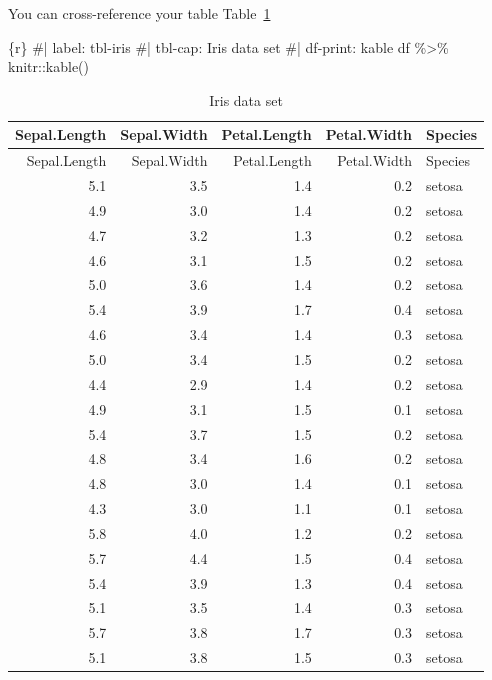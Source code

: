 \documentclass[
  letterpaper,
  DIV=11,
  numbers=noendperiod,
  oneside]{scrreprt}
\newenvironment{Shaded}{\begin{snugshade}}{\end{snugshade}}
\newcommand{\CommentTok}[1]{\textcolor[rgb]{0.37,0.37,0.37}{#1}}
\newcommand{\FunctionTok}[1]{\textcolor[rgb]{0.28,0.35,0.67}{#1}}
\newcommand{\InformationTok}[1]{\textcolor[rgb]{0.37,0.37,0.37}{#1}}
\newcommand{\NormalTok}[1]{\textcolor[rgb]{0.00,0.23,0.31}{#1}}
\newcommand{\SpecialCharTok}[1]{\textcolor[rgb]{0.37,0.37,0.37}{#1}}
\begin{document}
You can cross-reference your table Table~\ref{tbl-iris}

\begin{Shaded}
\begin{Highlighting}[]
\InformationTok{\textasciigrave{}\textasciigrave{}\textasciigrave{}\{r\}}
\CommentTok{\#| label: tbl{-}iris}
\CommentTok{\#| tbl{-}cap: Iris data set}
\CommentTok{\#| df{-}print: kable}
\NormalTok{df }\SpecialCharTok{\%\textgreater{}\%} 
\NormalTok{  knitr}\SpecialCharTok{::}\FunctionTok{kable}\NormalTok{()}
\InformationTok{\textasciigrave{}\textasciigrave{}\textasciigrave{}}
\end{Highlighting}
\end{Shaded}

\hypertarget{tbl-iris}{}
\begin{longtable}[]{@{}rrrrl@{}}
\caption{\label{tbl-iris}Iris data set}\tabularnewline
\toprule()
Sepal.Length & Sepal.Width & Petal.Length & Petal.Width & Species \\
\midrule()
\endfirsthead
\toprule()
Sepal.Length & Sepal.Width & Petal.Length & Petal.Width & Species \\
\midrule()
\endhead
5.1 & 3.5 & 1.4 & 0.2 & setosa \\
4.9 & 3.0 & 1.4 & 0.2 & setosa \\
4.7 & 3.2 & 1.3 & 0.2 & setosa \\
4.6 & 3.1 & 1.5 & 0.2 & setosa \\
5.0 & 3.6 & 1.4 & 0.2 & setosa \\
5.4 & 3.9 & 1.7 & 0.4 & setosa \\
4.6 & 3.4 & 1.4 & 0.3 & setosa \\
5.0 & 3.4 & 1.5 & 0.2 & setosa \\
4.4 & 2.9 & 1.4 & 0.2 & setosa \\
4.9 & 3.1 & 1.5 & 0.1 & setosa \\
5.4 & 3.7 & 1.5 & 0.2 & setosa \\
4.8 & 3.4 & 1.6 & 0.2 & setosa \\
4.8 & 3.0 & 1.4 & 0.1 & setosa \\
4.3 & 3.0 & 1.1 & 0.1 & setosa \\
5.8 & 4.0 & 1.2 & 0.2 & setosa \\
5.7 & 4.4 & 1.5 & 0.4 & setosa \\
5.4 & 3.9 & 1.3 & 0.4 & setosa \\
5.1 & 3.5 & 1.4 & 0.3 & setosa \\
5.7 & 3.8 & 1.7 & 0.3 & setosa \\
5.1 & 3.8 & 1.5 & 0.3 & setosa \\

\end{longtable}
\end{document}

